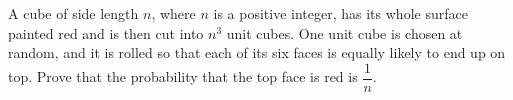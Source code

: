 A cube of side length $n$, where $n$ is a positive integer, has its whole surface painted red and is then cut into $n^3$ unit cubes. One unit cube is chosen at random, and it is rolled so that each of its six faces is equally likely to end up on top. Prove that the probability that the top face is red is $\dfrac1n$.
